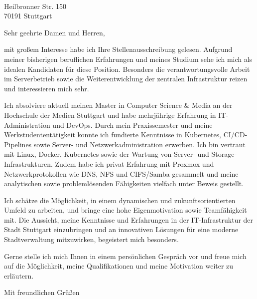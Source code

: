 \documentclass[DIN, pagenumber=false, parskip=half,%
               fromalign=right, 
               fromrule=false]{scrlttr2}
\begin{document}
 
\begin{letter}{ \\ Heilbronner Str. 150 \\ 70191 Stuttgart}


\enlargethispage{5cm}


\opening{Sehr geehrte Damen und Herren,}

mit großem Interesse habe ich Ihre Stellenausschreibung gelesen. Aufgrund meiner bisherigen beruflichen Erfahrungen und meines Studium  sehe ich mich als idealen Kandidaten für diese Position. Besonders die verantwortungsvolle Arbeit im Serverbetrieb sowie die Weiterentwicklung der zentralen Infrastruktur reizen und interessieren mich sehr.

Ich absolviere aktuell meinen Master in Computer Science \& Media an der Hochschule der Medien Stuttgart und habe mehrjährige Erfahrung in IT-Administration und DevOps. Durch mein Praxissemester und meine Werkstudententätigkeit konnte ich fundierte Kenntnisse in Kubernetes, CI/CD-Pipelines sowie Server- und Netzwerkadministration erwerben. Ich bin vertraut mit Linux, Docker, Kubernetes sowie der Wartung von Server- und Storage-Infrastrukturen. Zudem habe ich privat Erfahrung mit Proxmox und Netzwerkprotokollen wie DNS, NFS und CIFS/Samba gesammelt und meine analytischen sowie problemlösenden Fähigkeiten vielfach unter Beweis gestellt.

Ich schätze die Möglichkeit, in einem dynamischen und zukunftsorientierten Umfeld zu arbeiten, und bringe eine hohe Eigenmotivation sowie Teamfähigkeit mit. Die Aussicht, meine Kenntnisse und Erfahrungen in der IT-Infrastruktur der Stadt Stuttgart einzubringen und an innovativen Lösungen für eine moderne Stadtverwaltung mitzuwirken, begeistert mich besonders.

Gerne stelle ich mich Ihnen in einem persönlichen Gespräch vor und freue mich auf die Möglichkeit, meine Qualifikationen und meine Motivation weiter zu erläutern.

\closing{Mit freundlichen Grüßen}




\end{letter}
 
\end{document}
